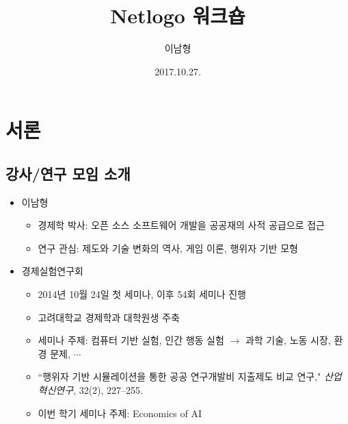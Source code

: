 \documentclass[hyperref={unicode}]{beamer}
\title{Netlogo 워크숍}
\author{이남형\inst{1}}
\institute{\inst{1} 연세대학교 경영연구소}
\date{2017.10.27.}
\begin{document}
\begin{frame}[plain]
\titlepage	
\end{frame}


\begin{frame}
\tableofcontents	
\end{frame}

\section{서론}
\subsection*{강사/연구 모임 소개}
\begin{frame}
\begin{itemize}
\item 이남형
	\begin{itemize}
	\item 경제학 박사: 오픈 소스 소프트웨어 개발을 공공재의 사적 공급으로 접근
	\item 연구 관심: 제도와 기술 변화의 역사, 게임 이론, 행위자 기반 모형
	\end{itemize}
\item 경제실험연구회
	\begin{itemize}
	\item 2014년 10월 24일 첫 세미나, 이후 54회 세미나 진행
	\item 고려대학교 경제학과 대학원생 주축
	\item 세미나 주제: 컴퓨터 기반 실험, 인간 행동 실험 $\rightarrow$ 과학 기술, 노동 시장, 환경 문제, $\cdots$
	\item ``행위자 기반 시뮬레이션을 통한 공공 연구개발비 지출제도 비교 연구," \textit{산업혁신연구}, 32(2), 227--255.
	\item 이번 학기 세미나 주제: Economics of AI
	\end{itemize}
\end{itemize}	
\end{frame}
\end{document}
